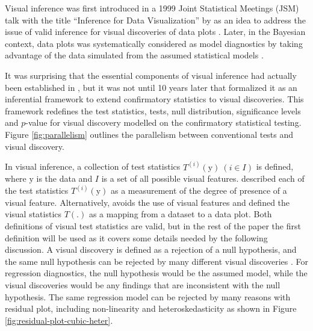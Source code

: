 \documentclass[]{interact}
\theoremstyle{plain}%
\theoremstyle{definition}
\theoremstyle{remark}
\begin{document}
Visual inference was first introduced in a 1999 Joint Statistical
Meetings (JSM) talk with the title ``Inference for Data Visualization''
by \citet{buja_inference_1999} as an idea to address the issue of valid
inference for visual discoveries of data plots
\citep{gelman_exploratory_2004}. Later, in the Bayesian context, data
plots was systematically considered as model diagnostics by taking
advantage of the data simulated from the assumed statistical models
\citep{gelman_bayesian_2003, gelman_exploratory_2004}.

It was surprising that the essential components of visual inference had
actually been established in \citet{buja_inference_1999}, but it was not
until 10 years later that \citet{buja_statistical_2009} formalized it as
an inferential framework to extend confirmatory statistics to visual
discoveries. This framework redefines the test statistics, tests, null
distribution, significance levels and \(p\)-value for visual discovery
modelled on the confirmatory statistical testing. Figure
\ref{fig:parallelism} outlines the parallelism between conventional
tests and visual discovery.

In visual inference, a collection of test statistics
\(T^{(i)}(\boldsymbol{\mathrm{y}})~(i \in I)\) is defined, where
\(\boldsymbol{\mathrm{y}}\) is the data and \(I\) is a set of all
possible visual features. \citet{buja_statistical_2009} described each
of the test statistics \(T^{(i)}(\boldsymbol{\mathrm{y}})\) as a
measurement of the degree of presence of a visual feature.
Alternatively, \citet{majumder_validation_2013} avoids the use of visual
features and defined the visual statistics \(T(.)\) as a mapping from a
dataset to a data plot. Both definitions of visual test statistics are
valid, but in the rest of the paper the first definition will be used as
it covers some details needed by the following discussion. A visual
discovery is defined as a rejection of a null hypothesis, and the same
null hypothesis can be rejected by many different visual discoveries
\citep{buja_statistical_2009}. For regression diagnostics, the null
hypothesis would be the assumed model, while the visual discoveries
would be any findings that are inconsistent with the null hypothesis.
The same regression model can be rejected by many reasons with residual
plot, including non-linearity and heteroskedasticity as shown in Figure
\ref{fig:residual-plot-cubic-heter}.
\end{document}
